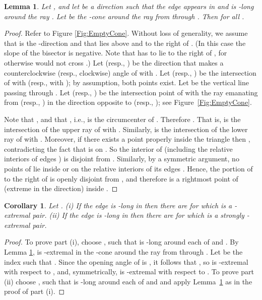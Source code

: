 \documentclass[letter,11pt]{article}
\newtheorem{corollary}[theorem]{Corollary}
\newtheorem{lemma}[theorem]{Lemma}
\begin{document}
\begin{lemma}\label{Lemma:EmptyCone}
Let , and let  be a direction such that the
edge  appears in  and is -long around the ray 
. Let  be the -cone around the ray from  through 
.  Then  for all
.
\end{lemma}
\begin{proof}
Refer to Figure \ref{Fig:EmptyCone}. Without loss of generality, we assume that  is the -direction
and that  lies above and to the right of . (In this case the slope of the bisector  is negative. Note that  has to
lie to the right of , for otherwise  would not cross .) 
Let 
(resp., ) be the direction that makes a counterclockwise (resp.,
clockwise) angle of  with . Let  (resp., ) be
the intersection  of  with  (resp., with ); by assumption, both points exist.
Let  be the vertical line passing through . Let 
(resp., ) be the intersection point of  with the ray
emanating from  (resp., ) in the direction opposite to
 (resp., ); see Figure~\ref{Fig:EmptyCone}.

Note that , and  that
, i.e.,  is the circumcenter
of .   Therefore . That is,  is the intersection of the upper ray of  with .
Similarly,  is the intersection of the lower ray of  with .
Moreover, if there exists a
 point  properly inside the triangle 
then
,
contradicting the fact that  is on . So the interior of  (including the relative interiors of edges ) is disjoint from .
 Similarly, by a symmetric argument, no points of  lie inside 
 or on the relative interiors of its edges .
Hence, the portion of  to the right of  is openly disjoint from , and therefore  is a rightmost point of  (extreme in the  direction) inside .\end{proof}

\begin{corollary}\label{Corol:ExtremalPair}
Let . 
\noindent (i) If the edge  is -long in 
then there are  for which 
is a -extremal pair.
\noindent(ii) If the edge  is -long in 
then there are  for which 
is a strongly -extremal pair.
\end{corollary}
\begin{proof}
To prove part (i), choose , such that  is
-long around each of   and  . By Lemma \ref{Lemma:EmptyCone},  is -extremal in the -cone  around the ray from  through . Let  be the index such that . Since the opening angle of  is , it follows that , so  is -extremal with respect to , and, symmetrically,  is -extremal with respect to . To prove part (ii) choose , such that  is -long around each of 
and  and apply
Lemma~\ref{Lemma:EmptyCone} as in the proof of part (i).
\end{proof}
\end{document}

